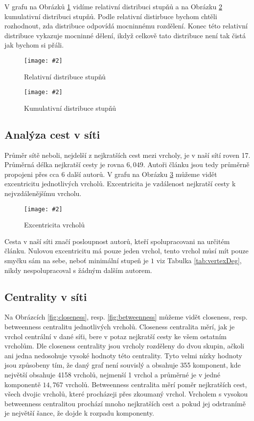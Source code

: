 \documentclass[a4paper,12pt]{article}
\newcommand{\image}[4]{\begin{figure}[h!] \centering \texttt{[image: \#2]} \caption{#4} \label{#3} \end{figure}}
\begin{document}
V grafu na Obrázků \ref{fig:relDegDist} vidíme relativní distribuci stupňů a na Obrázku \ref{fig:cummDegDist} kumulativní distribuci stupňů.
Podle relativní distirbuce bychom chtěli rozhodnout, zda distribuce odpovídá mocninnému rozdělení. Konec této relativní distribuce vykazuje mocninné dělení,
ikdyž celkově tato distribuce není tak čistá jak bychom si přáli.

\image{0.7}{../grafy/relDD.pdf}{fig:relDegDist}{Relativní distribuce stupňů}
\image{0.7}{../grafy/cumDD.pdf}{fig:cummDegDist}{Kumulativní distribuce stupňů}

\FloatBarrier
\newpage

\subsection{Analýza cest v síti}
Průměr sítě neboli, nejdelší z nejkratších cest mezi vrcholy, je v naší sítí roven 17. Průměrná délka nejkratší cesty je rovna $6,049$. Autoři článku jsou 
tedy průměrně propojeni přes cca $6$ další autorů. V grafu na Obrázku \ref{fig:eccentricity} můžeme vidět excentricitu jednotlivých vrcholů.
Excentricita je vzdálenost nejkratší cesty k nejvzdálenějšímu vrcholu.

\image{0.7}{../grafy/eccentricity.pdf}{fig:eccentricity}{Excentricita vrcholů}

Cesta v naší síti značí posloupnost autorů, kteří spolupracovani na určitém článku. Nulovou excentricitu má pouze jeden vrchol, tento vrchol můsí mít pouze
smyčku sám na sebe, neboť minimální stupeň je $1$ viz Tabulka \ref{tab:vertexDeg}, nikdy nespolupracoval s žádným dalším autorem.

\FloatBarrier
\newpage
\subsection{Centrality v síti}
Na Obrázcích \ref{fig:closeness}, resp. \ref{fig:betweenness} můžeme vidět closeness, resp. betweenness centralitu jednotlivých vrcholů.
Closeness centralita měrí, jak je vrchol centrální v dané síťi, bere v potaz nejkratší cesty ke všem ostatním vrcholům.
Dle closeness centrality jsou vrcholy rozděleny do dvou skupin, ačkoli ani jedna nedosohuje vysoké hodnoty této centrality. Tyto velmi nízky hodnoty jsou
způsobeny tím, že daný graf není souvislý a obsahuje 355 komponent, kde největší obsahuje 4158 vrcholů, nejmenší 1 vrchol a průměrné je v jedné komponentě
$14,767$ vrcholů.
Betweenness centralita měrí poměr nejkratších cest, všech dvojic vrcholů, které procházeji přes zkoumaný vrchol. Vrcholem s vysokou betweenness centralitou
prochází mnoho nejkratších cest a pokud jej odstranímě je největší šance, že dojde k rozpadu komponenty.
\end{document}
